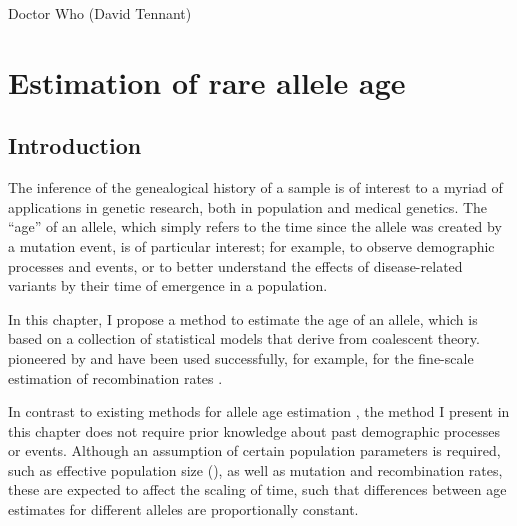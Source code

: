 
\glsresetall


{Doctor Who (David Tennant)}


{
\singlespacing
\chapter{Estimation of rare allele age}
\label{ch:rvage}
\minitoc
}


%
\section{Introduction}
%

The inference of the genealogical history of a sample is of interest to a myriad of applications in genetic research, both in population and medical genetics.
The ``age'' of an allele, which simply refers to the time since the allele was created by a mutation event, is of particular interest; for example, to observe demographic processes and events, or to better understand the effects of disease-related variants by their time of emergence in a population.

In this chapter, I propose a  method to estimate the age of an allele, which is based on a collection of statistical models that derive from coalescent theory.
 pioneered by \citet{Hudson:2001vs} and have been used successfully, for example, for the fine-scale estimation of recombination rates \citep{McVean:2004ca,Myers:2005vi}.

In contrast to existing methods for allele age estimation \citep[\eg, see review by][]{Slatkin:2000us}, the method I present in this chapter does not require prior knowledge about past demographic processes or events.
Although an assumption of certain population parameters is required, such as effective population size (\Ne), as well as mutation and recombination rates, these are expected to affect the scaling of time, such that differences between age estimates for different alleles are  proportionally constant.

